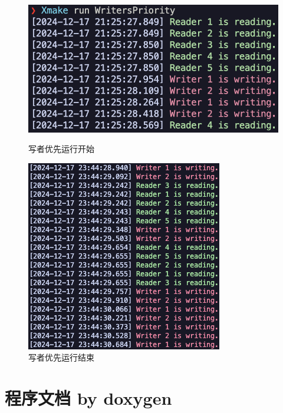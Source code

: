 \begin{figure}[H]
    \centering
    \begin{minipage}[t]{0.4\textwidth}
        \centering
        \includegraphics[width=\textwidth]{images/writer_start.png}
        \caption{写者优先运行开始}
    \end{minipage}
    \begin{minipage}[t]{0.4\textwidth}
        \centering
        \includegraphics[width=\textwidth]{images/writer_end.png}
        \caption{写者优先运行结束}
    \end{minipage}
\end{figure}

\appendix

\section{程序文档 by doxygen}

